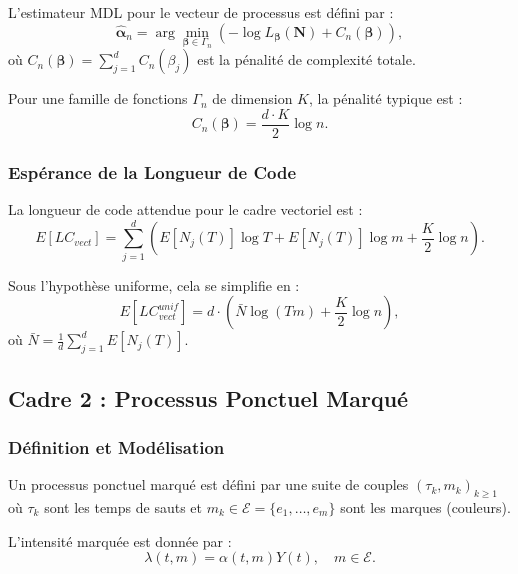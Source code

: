 \documentclass[11pt,a4paper]{article}
\begin{document}
	L'estimateur MDL pour le vecteur de processus est défini par :
	\begin{equation}
		\hat{\boldsymbol{\alpha}}_n = \arg \min_{\boldsymbol{\beta} \in \Gamma_n} \left( -\log L_{\boldsymbol{\beta}}(\mathbf{N}) + C_n(\boldsymbol{\beta}) \right),
	\end{equation}
	où $C_n(\boldsymbol{\beta}) = \sum_{j=1}^d C_n(\beta_j)$ est la pénalité de complexité totale.
	
	Pour une famille de fonctions $\Gamma_n$ de dimension $K$, la pénalité typique est :
	\begin{equation}
		C_n(\boldsymbol{\beta}) = \frac{d \cdot K}{2} \log n.
	\end{equation}
	
	\subsubsection{Espérance de la Longueur de Code}
	
	La longueur de code attendue pour le cadre vectoriel est :
	\begin{equation}
		E[LC_{vect}] = \sum_{j=1}^d \left( E[N_j(T)] \log T + E[N_j(T)] \log m + \frac{K}{2} \log n \right).
	\end{equation}
	
	Sous l'hypothèse uniforme, cela se simplifie en :
	\begin{equation}
		E[LC_{vect}^{unif}] = d \cdot \left( \bar{N} \log(Tm) + \frac{K}{2} \log n \right),
	\end{equation}
	où $\bar{N} = \frac{1}{d}\sum_{j=1}^d E[N_j(T)]$.
	
	\subsection{Cadre 2 : Processus Ponctuel Marqué}
	\label{subsec:cadre_marque}
	
	\subsubsection{Définition et Modélisation}
	
	Un processus ponctuel marqué est défini par une suite de couples $(\tau_k, m_k)_{k \geq 1}$ où $\tau_k$ sont les temps de sauts et $m_k \in \mathcal{E} = \{e_1, \dots, e_m\}$ sont les marques (couleurs).
	
	L'intensité marquée est donnée par :
	\begin{equation}
		\lambda(t, m) = \alpha(t, m)Y(t), \quad m \in \mathcal{E}.
	\end{equation}
	
\end{document}

